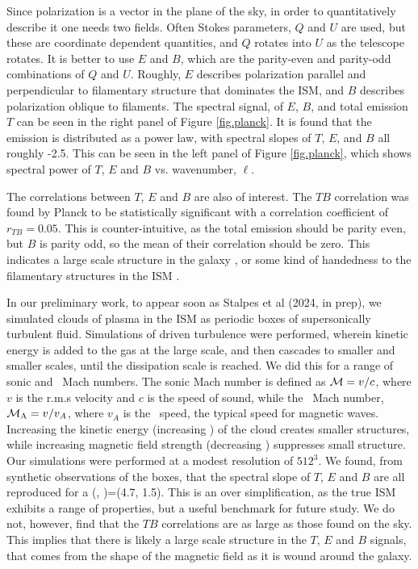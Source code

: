 Since polarization is a vector in the plane of the sky, in order to
quantitatively describe it one needs two fields.
Often Stokes parameters, $Q$ and $U$ are used, but these are coordinate
dependent quantities, and $Q$ rotates into $U$ as the telescope rotates.  It is
better to use $E$ and $B$, which are the parity-even and parity-odd combinations
of  $Q$ and $U$.  Roughly, $E$ describes polarization parallel and perpendicular
to filamentary structure that dominates the ISM, and $B$ describes polarization
oblique to filaments.  The spectral signal, of $E$, $B$, and total emission $T$
can be seen in the right panel of Figure \ref{fig.planck}.  It is found that the
emission is distributed as a power law, with spectral slopes of $T$, $E$, and
$B$ all roughly -2.5.   This can be seen in the left panel of Figure
\ref{fig.planck}, which shows spectral power of $T$, $E$ and $B$ vs. wavenumber,
$\ell$.

The correlations between $T$, $E$ and $B$ are also of interest.  The $TB$
correlation was found by Planck \citep{Planck18xi} to be statistically
significant with a correlation coefficient of $r_{TB}=0.05$.  This is
counter-intuitive, as the total emission should be parity even, but $B$ is
parity odd, so the mean of their correlation should be zero.  This indicates a large scale structure
in the galaxy \citep{Brandenburg20}, 
or some kind of handedness to the filamentary structures in the ISM
\citep{Huffenberger20}.  

In our preliminary work, to appear soon as Stalpes et al (2024, in prep),
we simulated clouds of plasma in the ISM as periodic boxes of supersonically turbulent fluid.
 Simulations of
driven turbulence were performed, wherein kinetic energy is added to the gas at the large
scale, and then cascades to smaller and smaller scales, until the dissipation
scale is reached.  We did this for a range of sonic and \alf\ Mach numbers.  The
sonic Mach number is defined as $\mathcal{M}=v/c$, where $v$ is the r.m.s velocity and $c$ is the
speed of sound, while the \alf\ Mach number, $\mathcal{M_{\rm{A}}}=v/v_A$, where $v_A$ is
the \alf\ speed, the typical speed for magnetic waves.  Increasing the kinetic
energy (increasing \mach) of the cloud creates smaller structures, while
increasing magnetic field 
strength (decreasing \alf) suppresses small structure.  
Our simulations were performed at a modest resolution of
$512^3$.  We found, from synthetic observations of the boxes, that the spectral
slope of $T$, $E$ and $B$ are all reproduced for a (\mach, \alfmach)=(4.7, 1.5).
This is an over simplification, as the true ISM exhibits a range of properties,
but a useful benchmark for future study.
We do not, however, find that the $TB$ correlations  are as large as
those found on the sky.  This implies that there is likely a large scale
structure in the $T$, $E$ and $B$ signals, that comes from the shape of the magnetic field as it is wound around
the galaxy.  

